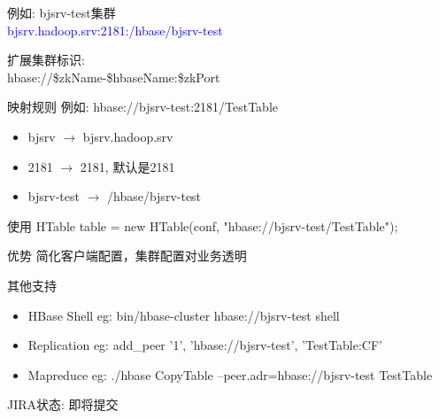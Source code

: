 \documentclass[xcolor=table]{beamer}
\begin{document}
\begin{CJK}{UTF8}{gkai}
\begin{frame}{\subsecname}
\bigskip

例如: bjsrv-test集群 \\
\bigskip
\textcolor{blue}{bjsrv.hadoop.srv:2181:/hbase/bjsrv-test}
\end{frame}

\begin{frame}{\subsecname}
扩展集群标识: \\

hbase://\${zkName}-\${hbaseName}:\${zkPort}

\begin{block}{映射规则}
  例如: hbase://bjsrv-test:2181/TestTable
	\begin{itemize}
	\item bjsrv $\rightarrow$ bjsrv.hadoop.srv
	\item 2181 $\rightarrow$ 2181, 默认是2181
	\item bjsrv-test $\rightarrow$ /hbase/bjsrv-test
	\end{itemize}
\end{block}

\begin{block}{使用}
  HTable table = new HTable(conf, "hbase://bjsrv-test/TestTable");
\end{block}

\begin{block}{优势}
  简化客户端配置，集群配置对业务透明
\end{block}
\end{frame}

\begin{frame}{\subsecname}
	其他支持
	\begin{itemize}
		\item \begin{block}{HBase Shell}
				\small eg: bin/hbase-cluster hbase://bjsrv-test shell
			\end{block}
		\item \begin{block}{Replication}
				\small eg: add\_peer '1', 'hbase://bjsrv-test', 'TestTable:CF'
			\end{block}
		\item \begin{block}{Mapreduce}
				\small eg: ./hbase CopyTable --peer.adr=hbase://bjsrv-test TestTable
			\end{block}
	\end{itemize}
	JIRA状态: 即将提交
\end{frame}


\end{CJK}
\end{document}
